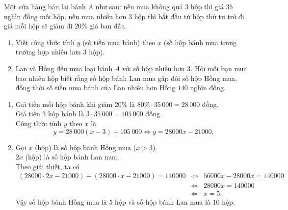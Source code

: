 \begin{bt}%
	Một cửa hàng bán lại bánh $A$ như sau: nếu mua không quá $3$ hộp thì giá $35$ nghìn đồng mỗi hộp, nếu mua nhiều hơn $3$ hộp thì bắt đầu từ hộp thứ tư trở đi giá mỗi hộp sẽ giảm đi $20\%$ giá ban đầu.
	\begin{enumerate}
		\item Viết công thức tính $y$ (số tiền mua bánh) theo $x$ (số hộp bánh mua trong trường hợp nhiều hơn $3$ hộp).
		\item Lan và Hồng đều mua loại bánh $A$ với số hộp nhiều hơn $3$. Hỏi mỗi bạn mua bao nhiêu hộp biết rằng số hộp bánh Lan mua gấp đôi số hộp Hồng mua, đồng thời số tiền mua bánh của Lan nhiều hơn Hồng $140$ nghìn đồng.
	\end{enumerate}
	\loigiai 
	{
		\begin{enumerate}
			\item Giá tiền mỗi hộp bánh khi giảm $20\%$ là $80\%\cdot 35\,000=28\,000$ đồng.\\
			Giá tiền $3$ hộp bánh là $3\cdot 35\,000=105\,000$ đồng.\\
			Công thức tính $y$ theo $x$ là \[y=28\,000(x-3)+105\,000\Leftrightarrow y=28000x-21000.\]
			\item Gọi $x$ (hộp) là số hộp bánh Hồng mua ($x>3$).\\
			$2x$ (hộp) là số hộp bánh Lan mua.\\
			Theo giải thiết, ta có 
			\allowdisplaybreaks
			\begin{eqnarray*}
				\left(28000\cdot 2x-21000\right)-\left(28000\cdot x-21000\right)=140000&\Leftrightarrow& 56000x-28000x=140000\\&\Leftrightarrow&28000x=140000\\
				&\Leftrightarrow&x=5.
			\end{eqnarray*}
			Vậy số hộp bánh Hồng mua là $5$ hộp và số hộp bánh Lan mua là $10$ hộp.
		\end{enumerate}	
	}	
\end{bt}

